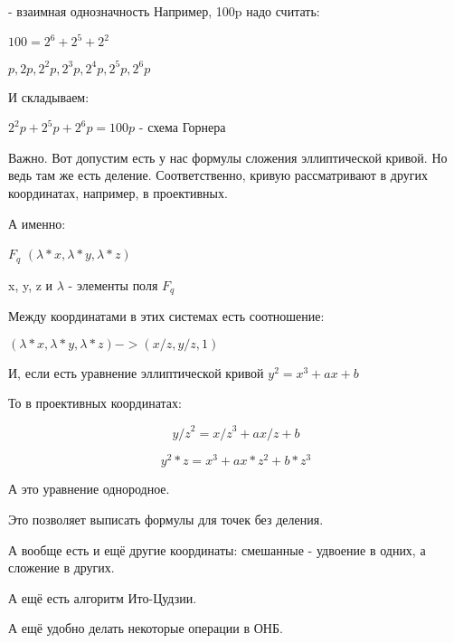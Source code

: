 - взаимная однозначность
Например, 100p надо считать:

$100 = 2^6 + 2^5 + 2^2$

$p,2p,2^2p,2^3p,2^4p,2^5p,2^6p$

И складываем:

$2^2p + 2^5p + 2^6p = 100p$ - схема Горнера

Важно. Вот допустим есть у нас формулы сложения эллиптической кривой. Но ведь там же есть деление. Соответственно, кривую рассматривают в других координатах, например, в проективных. 

А именно:

$F_q$            $(\lambda*x,\lambda*y,\lambda*z)$

x, y, z и $\lambda$ - элементы поля $F_q$

Между координатами в этих системах есть соотношение:

$(\lambda*x,\lambda*y,\lambda*z)->(x/z, y/z, 1)$

И, если есть уравнение эллиптической кривой $y^2 = x^3 + ax + b $

То в проективных координатах:

$${y/z}^2={x/z}^3+ax/z+b$$

$$y^2*z=x^3+ax*z^2+b*z^3$$

А это уравнение однородное. 

Это позволяет выписать формулы для точек без деления. 

А вообще есть и ещё другие координаты: смешанные - удвоение в одних, а сложение в других. 

А ещё есть алгоритм Ито-Цудзии. 

А ещё удобно делать некоторые операции в ОНБ.
